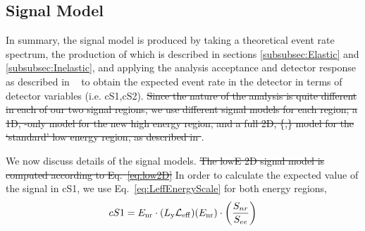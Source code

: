 \subsection{Signal Model}
\label{subsec:SignalModel}
In summary, the signal model is produced by taking a theoretical event rate spectrum, the production of which is described in sections \ref{subsubsec:Elastic} and \ref{subsubsec:Inelastic}, and applying the analysis acceptance and detector response as described in ~\cite{xe100_ana2012}  to obtain the expected event rate in the detector in terms of detector variables (i.e. cS1,cS2). \sout{Since the nature of the analysis is quite different in each of our two signal regions, we use different signal models for each region; a 1D, \cSi-only model for the new high energy region, and a full 2D, \{\cSi,\cSiib\} model for the `standard' low energy region, as described in \cite{xe100_run_combination}} . 

We now discuss details of the signal models. \sout{The lowE 2D signal model is computed according to Eq.~\ref{eq:low2D}}
In order to calculate the expected value of the signal in cS1, we use Eq.~\ref{eq:LeffEnergyScale} for both energy regions, 
\begin{equation}
\label{eq:LeffEnergyScale}
	cS1 = E_{\mathrm{nr}} \cdot (L_{\mathrm{y}} \mathcal{L}_{\mathrm{eff}})(E_{\mathrm{nr}})\cdot   \left(\frac{S_{nr}}{S_{ee}}\right) 
\end{equation}

%
%
%

